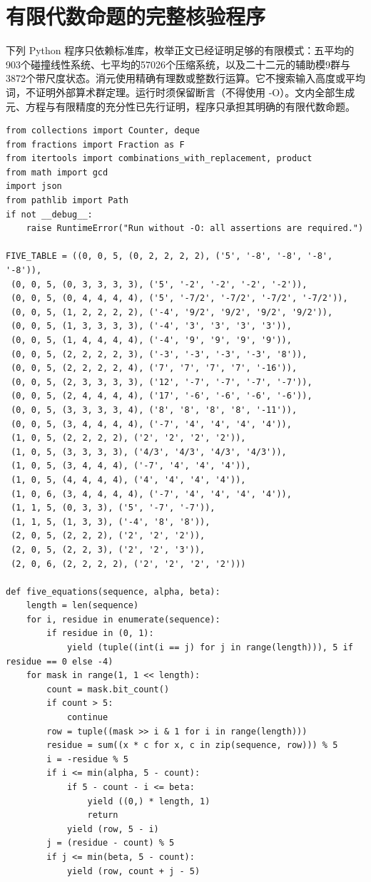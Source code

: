 \documentclass[11pt,a4paper]{article}
\theoremstyle{definition}
\numberwithin{equation}{section}
\begin{document}
\section{有限代数命题的完整核验程序}\label{sec:finite-program}
下列 Python 程序只依赖标准库，枚举正文已经证明足够的有限模式：五平均的903个碰撞线性系统、七平均的57026个压缩系统，以及二十二元的辅助模9群与3872个带尺度状态。消元使用精确有理数或整数行运算。它不搜索输入高度或平均词，不证明外部算术群定理。运行时须保留断言（不得使用 -O）。文内全部生成元、方程与有限精度的充分性已先行证明，程序只承担其明确的有限代数命题。

\begin{Verbatim}[fontsize=\scriptsize]
from collections import Counter, deque
from fractions import Fraction as F
from itertools import combinations_with_replacement, product
from math import gcd
import json
from pathlib import Path
if not __debug__:
    raise RuntimeError("Run without -O: all assertions are required.")

FIVE_TABLE = ((0, 0, 5, (0, 2, 2, 2, 2), ('5', '-8', '-8', '-8', '-8')),
 (0, 0, 5, (0, 3, 3, 3, 3), ('5', '-2', '-2', '-2', '-2')),
 (0, 0, 5, (0, 4, 4, 4, 4), ('5', '-7/2', '-7/2', '-7/2', '-7/2')),
 (0, 0, 5, (1, 2, 2, 2, 2), ('-4', '9/2', '9/2', '9/2', '9/2')),
 (0, 0, 5, (1, 3, 3, 3, 3), ('-4', '3', '3', '3', '3')),
 (0, 0, 5, (1, 4, 4, 4, 4), ('-4', '9', '9', '9', '9')),
 (0, 0, 5, (2, 2, 2, 2, 3), ('-3', '-3', '-3', '-3', '8')),
 (0, 0, 5, (2, 2, 2, 2, 4), ('7', '7', '7', '7', '-16')),
 (0, 0, 5, (2, 3, 3, 3, 3), ('12', '-7', '-7', '-7', '-7')),
 (0, 0, 5, (2, 4, 4, 4, 4), ('17', '-6', '-6', '-6', '-6')),
 (0, 0, 5, (3, 3, 3, 3, 4), ('8', '8', '8', '8', '-11')),
 (0, 0, 5, (3, 4, 4, 4, 4), ('-7', '4', '4', '4', '4')),
 (1, 0, 5, (2, 2, 2, 2), ('2', '2', '2', '2')),
 (1, 0, 5, (3, 3, 3, 3), ('4/3', '4/3', '4/3', '4/3')),
 (1, 0, 5, (3, 4, 4, 4), ('-7', '4', '4', '4')),
 (1, 0, 5, (4, 4, 4, 4), ('4', '4', '4', '4')),
 (1, 0, 6, (3, 4, 4, 4, 4), ('-7', '4', '4', '4', '4')),
 (1, 1, 5, (0, 3, 3), ('5', '-7', '-7')),
 (1, 1, 5, (1, 3, 3), ('-4', '8', '8')),
 (2, 0, 5, (2, 2, 2), ('2', '2', '2')),
 (2, 0, 5, (2, 2, 3), ('2', '2', '3')),
 (2, 0, 6, (2, 2, 2, 2), ('2', '2', '2', '2')))

def five_equations(sequence, alpha, beta):
    length = len(sequence)
    for i, residue in enumerate(sequence):
        if residue in (0, 1):
            yield (tuple((int(i == j) for j in range(length))), 5 if residue == 0 else -4)
    for mask in range(1, 1 << length):
        count = mask.bit_count()
        if count > 5:
            continue
        row = tuple((mask >> i & 1 for i in range(length)))
        residue = sum((x * c for x, c in zip(sequence, row))) % 5
        i = -residue % 5
        if i <= min(alpha, 5 - count):
            if 5 - count - i <= beta:
                yield ((0,) * length, 1)
                return
            yield (row, 5 - i)
        j = (residue - count) % 5
        if j <= min(beta, 5 - count):
            yield (row, count + j - 5)


\end{Verbatim}
\end{document}
